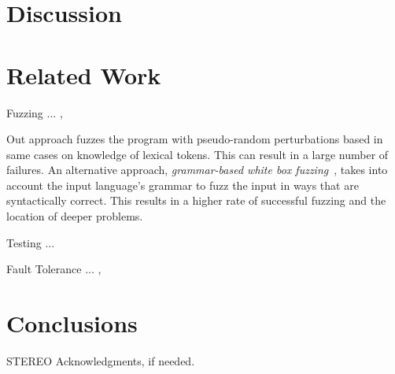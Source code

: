 \documentclass[10pt]{sigplanconf}
\begin{document}
\section{Discussion} %

\section{Related Work} %

Fuzzing ... \cite{TJC08}, \cite{WWGZ11}

Out approach fuzzes the program with pseudo-random
perturbations based in same cases on knowledge of
lexical tokens.
This can result in a large number of failures.
An alternative approach, {\em grammar-based white box fuzzing}~\cite{Cog08},
takes into account the input language's grammar to fuzz the input in
ways that are syntactically correct.
This results in a higher rate of successful fuzzing and the location
of deeper problems.


Testing ... \cite{HAM06}

Fault Tolerance ... \cite{KOKR07}, \cite{LYU95}

\section{Conclusions} %

\acks

STEREO
Acknowledgments, if needed.








\end{document}
